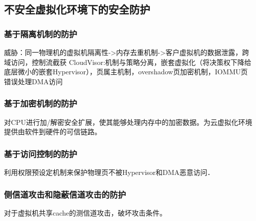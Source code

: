 \documentclass[UTF8]{ctexart}
\begin{document}
	\subsection{不安全虚拟化环境下的安全防护}
	\subsubsection{基于隔离机制的防护} 
	威胁：同一物理机的虚拟机隔离性->内存去重机制->客户虚拟机的数据泄露，跨域访问，控制流截获
	CloudVisor:机制与策略分离，嵌套虚拟化（将决策权下降给底层微小的嵌套Hypervisor），页属主机制，overshadow页加密机制，IOMMU页错误处理DMA访问

	\subsubsection{基于加密机制的防护} 
	对CPU进行加/解密安全扩展，使其能够处理内存中的加密数据。为云虚拟化环境提供由软件到硬件的可信链路。
	\subsubsection{基于访问控制的防护} 
	利用权限预设定机制来保护物理页不被Hypervisor和DMA恶意访问．
	\subsubsection{侧信道攻击和隐蔽信道攻击的防护} 
	对于虚拟机共享cache的测信道攻击，破坏攻击条件。
	\clearpage

	
\end{document}
